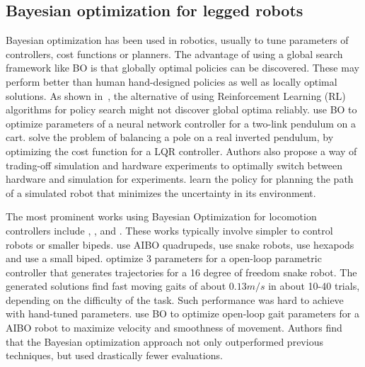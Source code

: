 \subsection{Bayesian optimization for legged robots}

Bayesian optimization has been used in robotics, usually to tune parameters of controllers, cost functions or planners. The advantage of using a global search framework like BO is that globally optimal policies can be discovered. These may perform better than human hand-designed policies as well as locally optimal solutions. As shown in~\cite{englert2016combined}, the alternative of using Reinforcement Learning (RL) algorithms for policy search might not discover global optima reliably. \cite{frean2008using} use BO to optimize parameters of a neural network controller for a two-link pendulum on a cart. \cite{marco2017virtual} solve the problem of balancing a pole on a real inverted pendulum, by optimizing the cost function for a LQR controller. Authors also propose a way of trading-off simulation and hardware experiments to optimally switch between hardware and simulation for experiments. \cite{martinez2007active} learn the policy for planning the path of a simulated robot that minimizes the uncertainty in its environment.

The most prominent works using Bayesian Optimization for locomotion controllers include \cite{lizotte2007automatic}, \cite{tesch}, \cite{cully2015robots} and \cite{calandra17thesis}. These works typically involve simpler to control robots or smaller bipeds. \cite{lizotte2007automatic} use AIBO quadrupeds, \cite{tesch} use snake robots, \cite{cully2015robots} use hexapods and \cite{calandra2016bayesian} use a small biped.  \cite{tesch} optimize 3 parameters for a open-loop parametric controller that generates trajectories for a 16 degree of freedom snake robot. The generated solutions find fast moving gaits of about $0.13m/s$ in about 10-40 trials, depending on the difficulty of the task. Such performance was hard to achieve with hand-tuned parameters. \cite{lizotte2007automatic} use BO to optimize open-loop gait parameters for a AIBO robot to maximize velocity and smoothness of movement. Authors find that the Bayesian optimization
approach not only outperformed previous techniques, but used drastically
fewer evaluations.


